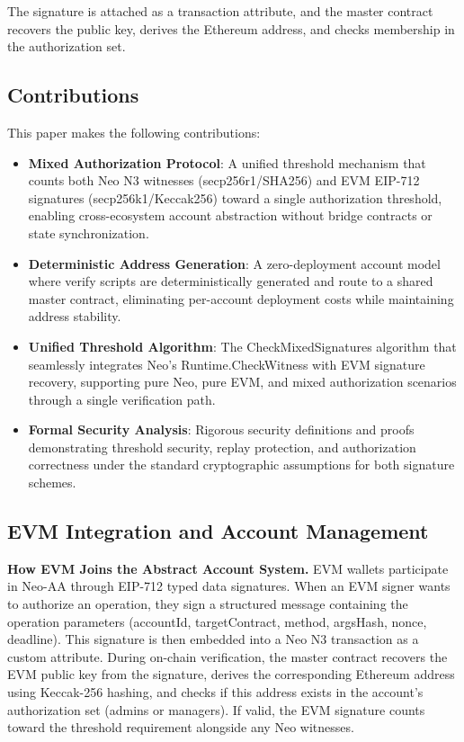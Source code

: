 \documentclass[10pt,twocolumn]{article}
\begin{document}
The signature is attached as a transaction attribute, and the master contract recovers the public key, derives the Ethereum address, and checks membership in the authorization set.

\subsection{Contributions}


This paper makes the following contributions:

\begin{itemize}[leftmargin=*,topsep=2pt,itemsep=1pt]

\item \textbf{Mixed Authorization Protocol}: A unified threshold mechanism that counts both Neo N3 witnesses (secp256r1/SHA256) and EVM EIP-712 signatures (secp256k1/Keccak256) toward a single authorization threshold, enabling cross-ecosystem account abstraction without bridge contracts or state synchronization.

\item \textbf{Deterministic Address Generation}: A zero-deployment account model where verify scripts are deterministically generated and route to a shared master contract, eliminating per-account deployment costs while maintaining address stability.

\item \textbf{Unified Threshold Algorithm}: The CheckMixedSignatures algorithm that seamlessly integrates Neo's Runtime.CheckWitness with EVM signature recovery, supporting pure Neo, pure EVM, and mixed authorization scenarios through a single verification path.

\item \textbf{Formal Security Analysis}: Rigorous security definitions and proofs demonstrating threshold security, replay protection, and authorization correctness under the standard cryptographic assumptions for both signature schemes.

\end{itemize}
\subsection{EVM Integration and Account Management}

\textbf{How EVM Joins the Abstract Account System.} EVM wallets participate in Neo-AA through EIP-712 typed data signatures. When an EVM signer wants to authorize an operation, they sign a structured message containing the operation parameters (accountId, targetContract, method, argsHash, nonce, deadline). This signature is then embedded into a Neo N3 transaction as a custom attribute. During on-chain verification, the master contract recovers the EVM public key from the signature, derives the corresponding Ethereum address using Keccak-256 hashing, and checks if this address exists in the account's authorization set (admins or managers). If valid, the EVM signature counts toward the threshold requirement alongside any Neo witnesses.
\end{document}
